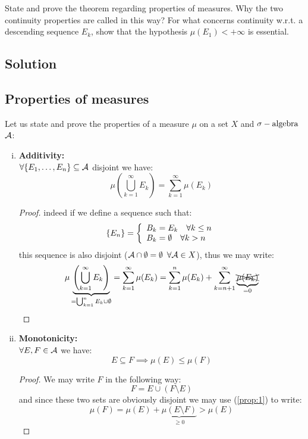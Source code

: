 \question
State and prove the theorem regarding properties of measures. Why the two continuity properties
are called in this way? For what concerns continuity w.r.t. a descending sequence ${E_k}$, show that
the hypothesis $\mu(E_1) < +\infty$ is essential.

\subsection*{Solution}
\subsection{Properties of measures}
Let us state and prove the properties of a measure $\mu$ on a set $X$ and $\sigma-\text{algebra}$ $\mathcal{A}$:
\begin{enumerate}[i)]
    \item \label{prop:1} \textbf{Additivity:} \\
    $\forall \{ E_1, \dots, E_n \} \subseteq \mathcal{A}$ disjoint we have:
    \[
        \mu\left( \bigcup_{k=1}^{\infty} E_k \right) = \sum_{k=1}^{\infty} \mu(E_k)
    \]
    \begin{proof}
    indeed if we define a sequence such that:
    \[
        \{ E_n \} = \left\{ \begin{array}{l}
            B_k = E_k \quad \forall k \leq n\\
            B_k = \emptyset \quad \forall k > n
        \end{array} \right.
    \]
    this sequence is also disjoint ($\mathcal{A}\cap\emptyset = \emptyset$ $\forall \mathcal{A}\in X$), thus we may write:
    \[
        \mu \underbrace{ \left( \bigcup_{k=1}^{\infty} E_k \right) }_{=\bigcup_{k=1}^{n} E_k \cup \emptyset}
         = \sum_{k=1}^{\infty} \mu(E_k) = \sum_{k=1}^{n} \mu(E_k) + \sum_{k=n+1}^{\infty} \underbrace{\xcancel{\mu(E_k)}}_{=0}
    \]
    \end{proof}

    \item \label{prop:2} \textbf{Monotonicity:} \\
    $\forall E,F \in \mathcal{A}$ we have:
    \[
        E\subseteq F \implies \mu(E) \leq \mu(F)    
    \]
    \begin{proof}
    We may write $F$ in the following way:
    \[
        F=E\cup (F \setminus E) 
    \]
    and since these two sets are obviously disjoint we may use (\ref{prop:1}) to write:
    \[
        \mu(F) = \mu(E)+\underbrace{\mu(E \setminus F)}_{\geq 0} > \mu(E)
    \]
    \end{proof}
    

\end{enumerate}
